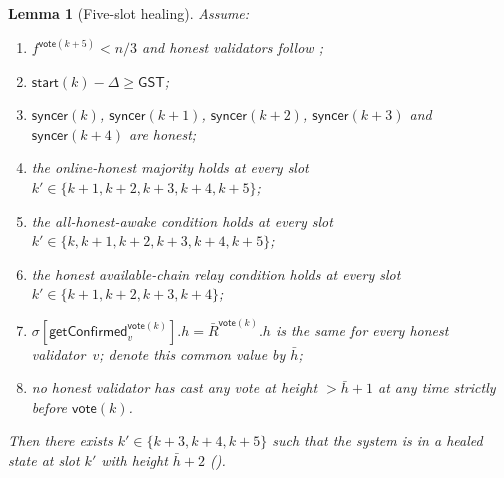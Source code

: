 \documentclass{article}
\newcommand{\syncer}{\mathsf{syncer}}
\newcommand{\start}{\mathsf{start}}
\newcommand{\vote}{\mathsf{vote}}
\newcommand{\comm}[1]{\bar{#1}}
\newcommand{\getConfirmed}{\textsf{getConfirmed}\xspace}
\theoremstyle{plain}
\newtheorem{lemma}{Lemma}
\theoremstyle{definition}
\theoremstyle{remark}
\newcommand{\GST}{\ensuremath{\mathsf{GST}}}
\newcommand{\OHM}{online-honest majority\xspace}
\newcommand{\HAR}{honest available-chain relay\xspace}
\newcommand{\AHA}{all-honest-awake\xspace}
\begin{document}
\begin{lemma}[Five-slot healing]\label{rev:lem:healing-five-slot}
Assume:
\begin{enumerate}
  \item $f^{\vote(k+5)} < n/3$ and honest validators follow ;
  \item $\start(k) - \Delta \geq \GST$;
  \item $\syncer(k)$, $\syncer(k+1)$, $\syncer(k+2)$, $\syncer(k+3)$ and $\syncer(k+4)$ are honest;
  \item the \OHM holds at every slot $k' \in \{k+1, k+2, k+3, k+4, k+5\}$;
  \item the \AHA condition holds at every slot $k' \in \{k, k+1, k+2, k+3, k+4, k+5\}$;
  \item the \HAR condition holds at every slot $k' \in \{k+1, k+2, k+3, k+4\}$;
  \item $\sigma[\getConfirmed_v^{\vote(k)}].h = \comm{R}^{\vote(k)}.h$ is the same for every honest validator~$v$; denote this common value by $\comm{h}$;
  \item no honest validator has cast any vote at height $> \comm{h}+1$ at any time strictly before $\vote(k)$.
\end{enumerate}
Then there exists $k' \in \{k+3, k+4, k+5\}$ such that the system is in a healed state at slot $k'$ with height $\comm{h}+2$ ().
\end{lemma}
\end{document}
